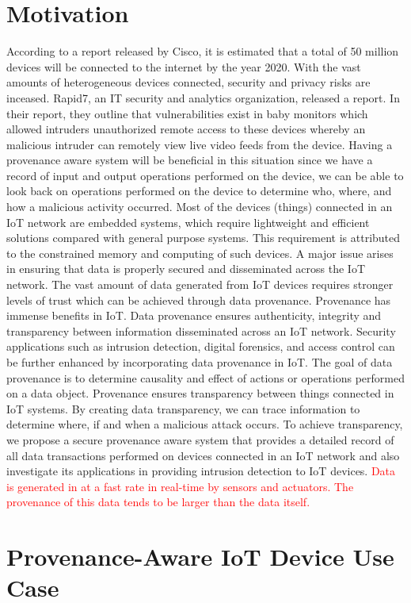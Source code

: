 \section{Motivation}
According to a report released by Cisco, it is estimated that a total of 50 million devices will be
connected to the internet by the year 2020. With the vast amounts of heterogeneous devices connected,
security and privacy risks are inceased. Rapid7, an  IT security and analytics organization, released a report. In their report, they outline that vulnerabilities exist in
baby monitors which allowed intruders unauthorized remote access to these devices
whereby an malicious intruder can remotely view live video feeds from the device. Having a provenance aware
system will be beneficial in this situation since we have a record of input and output
operations performed on the device, we can be able to look back on operations
performed on the device to determine who, where, and how a malicious activity
occurred. Most of the devices (things) connected in an IoT network are embedded systems, which
require lightweight and efficient solutions compared with general purpose
systems.
This requirement is attributed to the constrained memory and computing of such
devices. A major issue arises in ensuring that data is properly secured and
disseminated across the IoT network. The vast amount of data generated from IoT
devices requires stronger levels of trust which can be achieved through data
provenance. Provenance has immense benefits in IoT. Data provenance ensures
authenticity, integrity and transparency between information disseminated across an
IoT network. Security applications such as intrusion detection, digital forensics, and
access control can be further enhanced by incorporating data provenance in IoT. The goal of data provenance is to determine causality and effect of actions or
operations performed on a data object. Provenance ensures transparency between things
connected in IoT systems. By creating data transparency, we can trace information to
determine where, if and when a malicious attack occurs. To achieve transparency, we
propose a secure provenance aware system that provides a detailed record of all data
transactions performed on devices connected in an IoT network and also investigate its applications in providing intrusion detection to IoT devices.  \textcolor{red}{Data is generated in at a fast rate in real-time by sensors and actuators. The provenance of this data tends to be larger than the data itself.}

\section{Provenance-Aware IoT Device Use Case}

